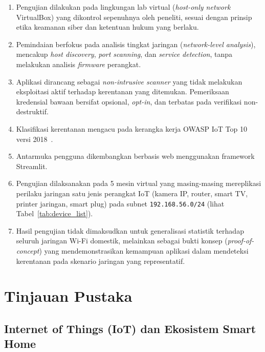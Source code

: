 \documentclass[conference]{IEEEtran}
\begin{document}
\begin{enumerate}
  \item Pengujian dilakukan pada lingkungan lab virtual (\textit{host-only
        network} VirtualBox) yang dikontrol sepenuhnya oleh peneliti,
        sesuai dengan prinsip etika keamanan siber dan ketentuan hukum
        yang berlaku.
  \item Pemindaian berfokus pada analisis tingkat jaringan
        (\textit{network-level analysis}), mencakup \textit{host discovery},
        \textit{port scanning}, dan \textit{service detection}, tanpa
        melakukan analisis \textit{firmware} perangkat.
  \item Aplikasi dirancang sebagai \textit{non-intrusive scanner} yang
        tidak melakukan eksploitasi aktif terhadap kerentanan yang
        ditemukan. Pemeriksaan kredensial bawaan bersifat opsional,
        \textit{opt-in}, dan terbatas pada verifikasi non-destruktif.
  \item Klasifikasi kerentanan mengacu pada kerangka kerja OWASP IoT
        Top 10 versi 2018~\cite{owasp2018}.
  \item Antarmuka pengguna dikembangkan berbasis web menggunakan
        framework Streamlit.
  \item Pengujian dilaksanakan pada 5 mesin virtual yang masing-masing
        mereplikasi perilaku jaringan satu jenis perangkat IoT (kamera IP,
        router, smart TV, printer jaringan, smart plug) pada subnet
        \texttt{192.168.56.0/24} (lihat Tabel~\ref{tab:device_list}).
  \item Hasil pengujian tidak dimaksudkan untuk generalisasi statistik
        terhadap seluruh jaringan Wi-Fi domestik, melainkan sebagai bukti
        konsep (\textit{proof-of-concept}) yang mendemonstrasikan
        kemampuan aplikasi dalam mendeteksi kerentanan pada skenario
        jaringan yang representatif.
\end{enumerate}

\section{Tinjauan Pustaka}

\subsection{Internet of Things (IoT) dan Ekosistem Smart Home}
\end{document}
